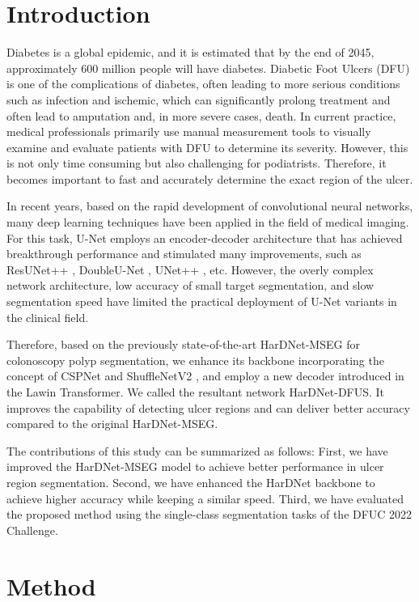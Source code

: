 \documentclass[runningheads]{llncs}
\begin{document}
\section{Introduction}
Diabetes is a global epidemic, and it is estimated that by the end of 2045, approximately 600 million people will have diabetes.
  Diabetic Foot Ulcers (DFU) is one of the complications of diabetes,
  often leading to more serious conditions such as infection and ischemic,
  which can significantly prolong treatment and
  often lead to amputation and, in more severe cases, death.
In current practice, medical professionals primarily
  use manual measurement tools to visually examine and
  evaluate patients with DFU to determine its severity.
  However, this is not only time consuming but also
  challenging for podiatrists.
  Therefore, it becomes important to
  fast and accurately determine the exact region of the ulcer.
  
In recent years, based on the rapid development of
  convolutional neural networks,
  many deep learning techniques have been applied
  in the field of medical imaging. 
For this task, U-Net \cite{U-Net} employs
  an encoder-decoder architecture
  that has achieved breakthrough performance and
  stimulated many improvements,
  such as ResUNet++ \cite{ResUNet++}, DoubleU-Net \cite{DoubleU-Net}, UNet++ \cite{UNet++}, etc. 
However, the overly complex network architecture,
  low accuracy of small target segmentation, and slow segmentation speed have limited the practical deployment of U-Net variants in the clinical field.
  
Therefore, based on the previously state-of-the-art
  HarDNet-MSEG \cite{HarDNet-MSEG} for colonoscopy polyp segmentation,
  we enhance its backbone incorporating the concept of CSPNet \cite{CSPNet} and ShuffleNetV2 \cite{ShuffleNetV2}, and
  employ a new decoder introduced in
  the Lawin Transformer\cite{lawin}.
  We called the resultant network HarDNet-DFUS.
  It improves the capability of detecting ulcer regions and
  can deliver better accuracy compared to
  the original HarDNet-MSEG.  
  
The contributions of this study can be summarized as follows: 
  First, we have improved the HarDNet-MSEG model to
  achieve better performance in ulcer region segmentation.
  Second, we have enhanced the HarDNet \cite{HarDNet} backbone
  to achieve higher accuracy while keeping a similar speed.
  Third, we have evaluated the proposed method using
  the single-class segmentation tasks of the DFUC 2022 Challenge.
\section{Method}
\end{document}
